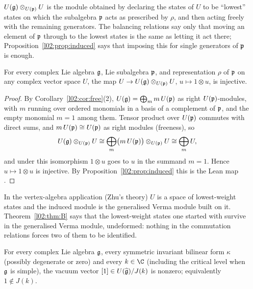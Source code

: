 \begin{physics}
$U(\mathfrak{g})\otimes_{U(\mathfrak{p})}U$ is the module obtained by declaring the states of $U$ to be ``lowest''
states on which the subalgebra $\mathfrak{p}$ acts as prescribed by $\rho$, and then acting freely with the
remaining generators. The balancing relations say only that moving an element of $\mathfrak{p}$ through to the
lowest states is the same as letting it act there; Proposition~\ref{l02:prop:induced} says that imposing
this for single generators of $\mathfrak{p}$ is enough.
\end{physics}

\begin{theorem}\label{l02:thm:B}
For every complex Lie algebra $\mathfrak{g}$, Lie subalgebra $\mathfrak{p}$, and representation $\rho$ of $\mathfrak{p}$ on
any complex vector space $U$, the map $U\to U(\mathfrak{g})\otimes_{U(\mathfrak{p})}U$, $u\mapsto 1\otimes u$, is
injective.
\end{theorem}

\begin{proof}
By Corollary~\ref{l02:cor:free}(2), $U(\mathfrak{g}) = \bigoplus_m m\,U(\mathfrak{p})$ as right $U(\mathfrak{p})$-modules,
with $m$ running over ordered monomials in a basis of a complement of $\mathfrak{p}$, and the empty
monomial $m=1$ among them. Tensor product over $U(\mathfrak{p})$ commutes with direct sums, and
$m\,U(\mathfrak{p})\cong U(\mathfrak{p})$ as right modules (freeness), so
\begin{equation*}
 U(\mathfrak{g})\otimes_{U(\mathfrak{p})}U \cong \bigoplus_m \bigl(m\,U(\mathfrak{p})\bigr)\otimes_{U(\mathfrak{p})}U\cong\bigoplus_m U,
\end{equation*}
and under this isomorphism $1\otimes u$ goes to $u$ in the summand $m=1$. Hence $u\mapsto 1\otimes u$
is injective. By Proposition~\ref{l02:prop:induced} this is the Lean map .
\end{proof}

\begin{physics}
In the vertex-algebra application (Zhu's theory) $U$ is a space of lowest-weight states and the induced
module is the generalised Verma module built on it. Theorem~\ref{l02:thm:B} says that the lowest-weight
states one started with survive in the generalised Verma module, undeformed: nothing in the commutation
relations forces two of them to be identified.
\end{physics}

\begin{theorem}\label{l02:thm:A}
For every complex Lie algebra $\mathfrak{g}$, every symmetric invariant bilinear form $\kappa$ (possibly
degenerate or zero) and every $k\in\C$ (including the critical level when $\mathfrak{g}$ is simple), the
vacuum vector $[1]\in U(\widehat{\mathfrak{g}})/J(k)$ is nonzero; equivalently $1\notin J(k)$.
\end{theorem}

